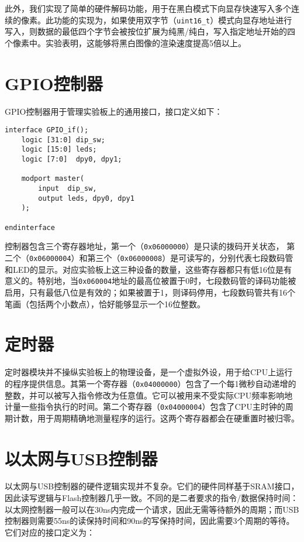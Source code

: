 此外，我们实现了简单的硬件解码功能，用于在黑白模式下向显存快速写入多个连续的像素。此功能的实现为，如果使用双字节（\texttt{uint16\_t}）模式向显存地址进行写入，则数据的最低四个字节会被按位扩展为纯黑/纯白，写入指定地址开始的四个像素中。实验表明，这能够将黑白图像的渲染速度提高5倍以上。

\section{GPIO控制器}

GPIO控制器用于管理实验板上的通用接口，接口定义如下：

\begin{verbatim}
interface GPIO_if();
    logic [31:0] dip_sw;
    logic [15:0] leds;
    logic [7:0]  dpy0, dpy1;

    modport master(
        input  dip_sw,
        output leds, dpy0, dpy1
    );

endinterface
\end{verbatim}

控制器包含三个寄存器地址，第一个（\texttt{0x06000000}）是只读的拨码开关状态， 第二个（\texttt{0x06000004}）和第三个（\texttt{0x06000008}）是可读写的，分别代表七段数码管和LED的显示。对应实验板上这三种设备的数量，这些寄存器都只有低16位是有意义的。特别地，当\texttt{0x060004}地址的最高位被置于0时，七段数码管的译码功能被启用，只有最低八位是有效的；如果被置于1，则译码停用，七段数码管共有16个笔画（包括两个小数点），恰好能够显示一个16位整数。

\section{定时器}

定时器模块并不操纵实验板上的物理设备，是一个虚拟外设，用于给CPU上运行的程序提供信息。其第一个寄存器（\texttt{0x04000000}）包含了一个每1微秒自动递增的整数，并可以被写入指令修改为任意值。它可以被用来不受实际CPU频率影响地计量一些指令执行的时间。第二个寄存器（\texttt{0x04000004}）包含了CPU主时钟的周期计数，用于周期精确地测量程序的运行。这两个寄存器都会在硬重置时被归零。

\section{以太网与USB控制器}

以太网与USB控制器的硬件逻辑实现并不复杂。它们的硬件同样基于SRAM接口，因此读写逻辑与Flash控制器几乎一致。不同的是二者要求的指令/数据保持时间：以太网控制器一般可以在30ns内完成一个请求，因此无需等待额外的周期；而USB控制器则需要55ns的读保持时间和90ns的写保持时间，因此需要3个周期的等待。它们对应的接口定义为：

